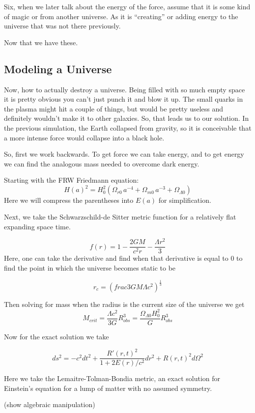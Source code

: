 Six, when we later talk about the energy of the force, assume that it is some kind of magic or from another universe. As it is ``creating'' or adding energy to the universe that was not there previously.

Now that we have these.

\subsection{Modeling a Universe}

Now, how to actually destroy a universe. Being filled with so much empty space it is pretty obvious you can't just punch it and blow it up. The small quarks in the plasma might hit a couple of things, but would be pretty useless and definitely wouldn't make it to other galaxies. So, that leads us to our solution. In the previous simulation, the Earth collapsed from gravity, so it is conceivable that a more intense force would collapse into a black hole.

So, first we work backwards. To get force we can take energy, and to get energy we can find the analogous mass needed to overcome dark energy.

Starting with the FRW Friedmann equation:
\[
	H(a)^2= H_0^2 \left( \Omega_{r0}\,a^{-4} + \Omega_{m0}\,a^{-3} + \Omega_{\Lambda 0} \right)
\]
Here we will compress the parentheses into $E(a)$ for simplification.

Next, we take the Schwarzschild-de Sitter metric function for a relatively flat expanding space time.

\[
	f(r) = 1 - \frac{2GM}{c^2r}-\frac{\Lambda r^2}{3}
\]
Here, one can take the derivative and find when that derivative is equal to 0 to find the point in which the universe becomes static to be

\[
	r_c = \left(frac{3GM}{\Lambda c^2}   \right)^{\frac{1}{3}}
\]

Then solving for mass when the radius is the current size of the universe we get
\[
	M_{crit} = \frac{\Lambda c^2}{3G}R^3_{obs} = \frac{\Omega_{\Lambda 0}H^2_0}{G}R^3_{obs}
\]

Now for the exact solution we take

\[
	ds^2 = -c^2dt^2 + \frac{R'(r,t)^2}{1+2E(r)/c^2}dr^2 + R(r,t)^2 d \Omega^2
\]

Here we take the Lemaitre-Tolman-Bondia metric, an exact solution for Einstein's equation for a lump of matter with no assumed symmetry.

(show algebraic manipulation)

